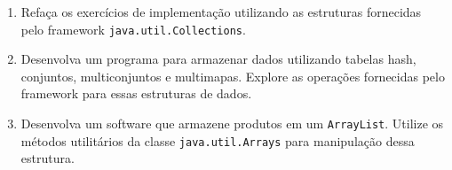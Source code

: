 \medskip


\begin{enumerate}
	\item Refaça os exercícios de implementação utilizando as estruturas fornecidas pelo framework \texttt{java.util.Collections}.
	
	\item Desenvolva um programa para armazenar dados utilizando tabelas hash, conjuntos, multiconjuntos e multimapas. Explore as operações fornecidas pelo framework para essas estruturas de dados.
	
	\item Desenvolva um software que armazene produtos em um \texttt{ArrayList}. Utilize os métodos utilitários da classe \texttt{java.util.Arrays} para manipulação dessa estrutura.
\end{enumerate}

\clearpage

\begingroup
	\footnotesize
	\renewcommand{\chapter}[2]{}%
	
	
\endgroup

